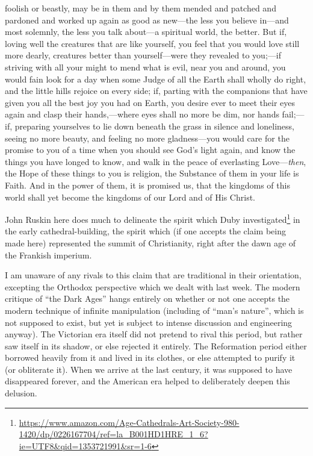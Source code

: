 \begin{quotex}
foolish or beastly, may be in them and by them mended and patched and pardoned and worked up again as good as new---the less you believe in---and most solemnly, the less you talk about---a spiritual world, the better. But if, loving well the creatures that are like yourself, you feel that you would love still more dearly, creatures better than yourself---were they revealed to you;---if striving with all your might to mend what is evil, near you and around, you would fain look for a day when some Judge of all the Earth shall wholly do right, and the little hills rejoice on every side; if, parting with the companions that have given you all the best joy you had on Earth, you desire ever to meet their eyes again and clasp their hands,---where eyes shall no more be dim, nor hands fail;---if, preparing yourselves to lie down beneath the grass in silence and loneliness, seeing no more beauty, and feeling no more gladness---you would care for the promise to you of a time when you should see God's light again, and know the things you have longed to know, and walk in the peace of everlasting Love---\emph{then}, the Hope of these things to you is religion, the Substance of them in your life is Faith. And in the power of them, it is promised us, that the kingdoms of this world shall yet become the kingdoms of our Lord and of His Christ.
\end{quotex}


John Ruskin here does much to delineate the spirit which Duby investigated\footnote{\url{https://www.amazon.com/Age-Cathedrals-Art-Society-980-1420/dp/0226167704/ref=la\_B001HD1HRE\_1\_6?ie=UTF8\&qid=1353721991\&sr=1-6}} in the early cathedral-building, the spirit which (if one accepts the claim being made here) represented the summit of Christianity, right after the dawn age of the Frankish imperium.

I am unaware of any rivals to this claim that are traditional in their orientation, excepting the Orthodox perspective which we dealt with last week. The modern critique of ``the Dark Ages'' hangs entirely on whether or not one accepts the modern technique of infinite manipulation (including of ``man's nature'', which is not supposed to exist, but yet is subject to intense discussion and engineering anyway). The Victorian era itself did not pretend to rival this period, but rather saw itself in its shadow, or else rejected it entirely. The Reformation period either borrowed heavily from it and lived in its clothes, or else attempted to purify it (or obliterate it). When we arrive at the last century, it was supposed to have disappeared forever, and the American era helped to deliberately deepen this delusion.

